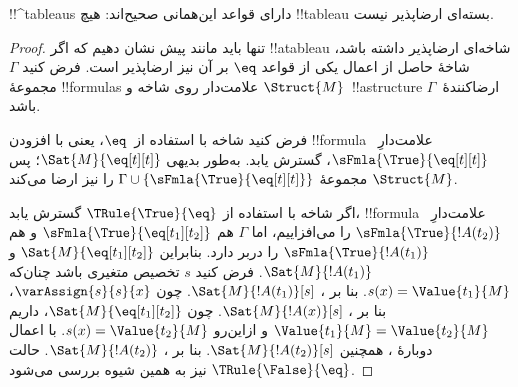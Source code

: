\documentclass[../../../include/open-logic-section]{subfiles}
\begin{document}


\begin{prop}
!!^{tableau}s دارای قواعد این‌همانی صحیح‌اند: هیچ !!{tableau} بسته‌ای
ارضاپذیر نیست.
\end{prop}

\begin{proof}
تنها باید مانند پیش نشان دهیم که اگر !!a{tableau} شاخه‌ای ارضاپذیر
داشته باشد، شاخهٔ حاصل از اعمال یکی از قواعد $\eq$ بر آن نیز ارضاپذیر
است. فرض کنید $\Gamma$ مجموعهٔ !!{formula}s علامت‌دار روی شاخه و
$\Struct{M}$~!!a{structure} ارضاکنندهٔ~$\Gamma$ باشد.

فرض کنید شاخه با استفاده از~$\eq$، یعنی با افزودن !!{formula}
علامت‌دارِ~$\sFmla{\True}{\eq[t][t]}$، گسترش یابد. به‌طور بدیهی
$\Sat{M}{\eq[t][t]}$؛ پس $\Struct{M}$ مجموعهٔ
$\Gamma \cup \{\sFmla{\True}{\eq[t][t]}\}$ را نیز ارضا می‌کند.

اگر شاخه با استفاده از $\TRule{\True}{\eq}$ گسترش یابد، !!{formula}
علامت‌دارِ~$\sFmla{\True}{!A(t_2)}$ را می‌افزاییم، اما $\Gamma$ هم
$\sFmla{\True}{\eq[t_1][t_2]}$ و هم $\sFmla{\True}{!A(t_1)}$ را دربر
دارد. بنابراین $\Sat{M}{\eq[t_1][t_2]}$ و
$\Sat{M}{!A(t_1)}$. فرض کنید $s$ تخصیص متغیری باشد چنان‌که
$s(x) = \Value{t_1}{M}$. بنا بر
، $\Sat{M}{!A(t_1)}[s]$.
چون $\varAssign{s}{s}{x}$، بنا بر
، $\Sat{M}{!A(x)}[s]$. چون
$\Sat{M}{\eq[t_1][t_2]}$، داریم
$\Value{t_1}{M} = \Value{t_2}{M}$ و ازاین‌رو
$s(x) = \Value{t_2}{M}$. با اعمال دوبارهٔ
، همچنین
$\Sat{M}{!A(t_2)}[s]$. بنا بر
، $\Sat{M}{!A(t_2)}$. حالت
$\TRule{\False}{\eq}$ نیز به همین شیوه بررسی می‌شود.
\end{proof}
\end{document}
